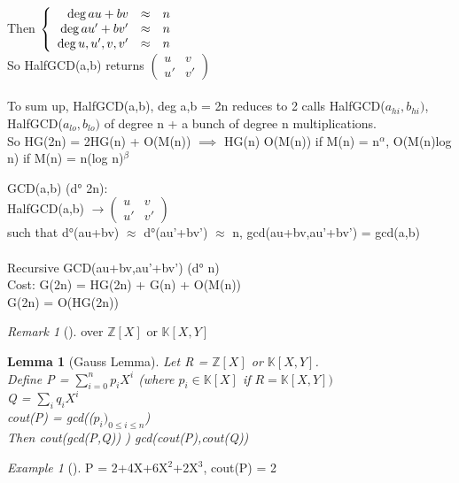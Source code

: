 \documentclass{article}
\newtheorem{lemma}{Lemma}
\theoremstyle{definition}
\theoremstyle{remark}
\newtheorem*{remark}{Remark}
\newtheorem*{example}{Example}
\newcommand{\Ex}[3]{\begin{example}[#1]\label{#2}#3\end{example}}
\newcommand{\Lem}[3]{\begin{lemma}[#1]\label{#2}#3\end{lemma}}
\newcommand{\Rem}[3]{\begin{remark}[#1]\label{#2}#3\end{remark}}
\newcommand{\Z}{\mathbb{Z}}
\newcommand{\K}{\mathbb{K}}
\begin{document}
Then $\left\{\begin{array}{r c l}
\deg au+bv & \approx & n\\
\deg au'+bv' & \approx & n\\
\deg u,u',v,v' & \approx & n
\end{array}\right .$\\
So HalfGCD(a,b) returns $\begin{pmatrix}
u&v\\u'&v'
\end{pmatrix}$\\\\

To sum up, HalfGCD(a,b), deg a,b = 2n reduces to 2 calls HalfGCD($a_{hi},b_{hi})$, HalfGCD($a_{lo},b_{lo})$ of degree n + a bunch of degree n multiplications.\\
So HG(2n) = 2HG(n) + O(M(n)) $ \implies$ HG(n) O(M(n)) if M(n) = n$^\alpha$, O(M(n)log n) if M(n) = n(log n)$^\beta$

GCD(a,b) (d° 2n):\\
HalfGCD(a,b) $\rightarrow \begin{pmatrix}
u&v\\u'&v'
\end{pmatrix}$\\
such that d°(au+bv) $\approx$ d°(au'+bv') $\approx$ n, gcd(au+bv,au'+bv') = gcd(a,b)\\\\
Recursive GCD(au+bv,au'+bv') (d° n)\\

Cost: G(2n) = HG(2n) + G(n) + O(M(n))\\
G(2n) = O(HG(2n))

\Rem{}{}{over $\Z[X]$ or $\K[X,Y]$}

\Lem{Gauss Lemma}{}{Let R = $\Z[X]$ or $\K[X,Y]$.\\
	Define P = $\sum\limits_{i=0}^n p_iX^i$ (where $p_i \in \K[X]$ if $R = \K[X,Y])$\\
	Q =  $\sum\limits_{i} q_iX^i$\\
	cout(P) = gcd(($p_i)_{0\leq i\leq n}$)\\
	Then cout(gcd(P,Q)) ) gcd(cout(P),cout(Q))}

\Ex{}{}{P = 2+4X+6X$^2$+2X$^3$, cout(P) = 2}
\end{document}
